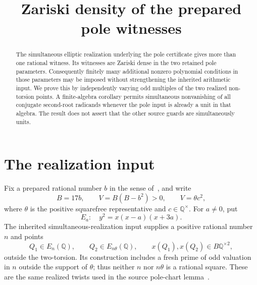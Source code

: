 \documentclass[11pt,a4paper]{article}
\title{Zariski density of the prepared pole witnesses}
\author{}\date{}
\newcommand{\Q}{\mathbb Q}\newcommand{\Z}{\mathbb Z}
\begin{document}
\maketitle
\begin{abstract}
The simultaneous elliptic realization underlying the pole certificate
gives more than one rational witness.  Its witnesses are Zariski dense
in the two retained pole parameters.  Consequently finitely many
additional nonzero polynomial conditions in those parameters may be
imposed without strengthening the inherited arithmetic input.  We
prove this by independently varying odd multiples of the two realized
non-torsion points.  A finite-algebra corollary permits simultaneous
nonvanishing of all conjugate second-root radicands whenever the pole
input is already a unit in that algebra.  The result does not assert
that the other source guards are simultaneously units.
\end{abstract}

\section{The realization input}

Fix a prepared rational number $b$ in the sense of~\cite{Dependencies},
and write
\[
 B=17b,\qquad V=B(B-b^2)>0,\qquad V=\theta c^2,
\]
where $\theta$ is the positive squarefree representative and
$c\in\Q^\times$.  For $a\ne0$, put
\[
                      E_a:\quad y^2=x(x-a)(x+3a).
\]
The inherited simultaneous-realization input supplies a positive
rational number $n$ and points
\begin{equation}\label{eq:realization}
 Q_1\in E_n(\Q),\qquad Q_2\in E_{n\theta}(\Q),\qquad
 x(Q_1),x(Q_2)\in B\Q^{\times2},
\end{equation}
outside the two-torsion.  Its construction includes a fresh prime
of odd valuation in $n$ outside the support of $\theta$; thus neither
$n$ nor $n\theta$ is a rational square.  These are the same
realized twists used in the source pole-chart lemma~\cite{Source}.
\end{document}
